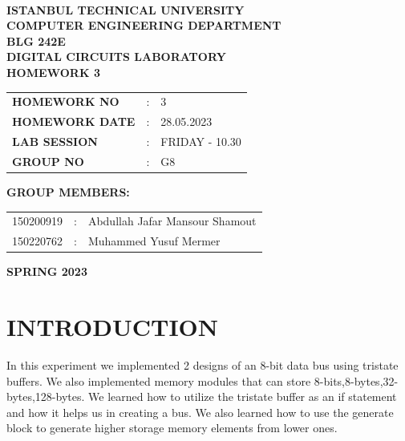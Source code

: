 \documentclass[pdftex,12pt,a4paper]{article}
\begin{document}
\begin{titlepage}
\begin{center}
\textbf{}\\
\textbf{\Large{ISTANBUL TECHNICAL UNIVERSITY}}\\
\vspace{0.5cm}
\textbf{\Large{COMPUTER ENGINEERING DEPARTMENT}}\\
\vspace{2cm}
\textbf{\Large{BLG 242E\\ DIGITAL CIRCUITS LABORATORY\\ HOMEWORK 3}}\\
\vspace{2.8cm}
\begin{table}[ht]
\centering
\Large{
\begin{tabular}{lcl}
\textbf{HOMEWORK NO}  & : & 3 \\
\textbf{HOMEWORK DATE}  & : & 28.05.2023\\
\textbf{LAB SESSION}  & : & FRIDAY - 10.30 \\
\textbf{GROUP NO}  & : & G8 \\
\end{tabular}}
\end{table}
\vspace{1cm}
\textbf{\Large{GROUP MEMBERS:}}\\
\begin{table}[ht]
\centering
\Large{
\begin{tabular}{rcl}
150200919  & : & Abdullah Jafar Mansour Shamout \\
150220762  & : & Muhammed Yusuf Mermer  \\
\end{tabular}}
\end{table}
\vspace{2.8cm}
\textbf{\Large{SPRING 2023}}

\end{center}

\end{titlepage}

\thispagestyle{empty}
\setcounter{tocdepth}{4}
\tableofcontents
\clearpage

\setcounter{page}{1}

\section{INTRODUCTION} 
In this experiment we implemented 2 designs of an 8-bit data bus using tristate buffers. We also implemented memory modules that can store 8-bits,8-bytes,32-bytes,128-bytes. We learned how to utilize the tristate buffer as an if statement and how it helps us in creating a bus. We also learned how to use the generate block to generate higher storage memory elements from lower ones.
\end{document}
